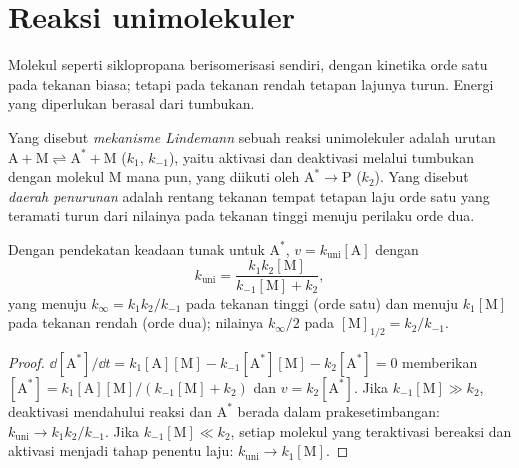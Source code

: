 \section{Reaksi unimolekuler}

Molekul seperti siklopropana berisomerisasi sendiri, dengan kinetika orde
satu pada tekanan biasa; tetapi pada tekanan rendah tetapan lajunya turun.
Energi yang diperlukan berasal dari tumbukan.

\begin{definition}\label{def:b3:complex-kinetics:lindemann}
Yang disebut \emph{mekanisme Lindemann} sebuah
reaksi unimolekuler adalah urutan $\mathrm{A + M \rightleftharpoons A^* + M}$ ($k_1$,
$k_{-1}$), yaitu aktivasi dan deaktivasi melalui tumbukan dengan molekul M
mana pun, yang diikuti oleh $\mathrm{A^* \to P}$ ($k_2$). Yang disebut
\emph{daerah penurunan} adalah rentang tekanan tempat
tetapan laju orde satu yang teramati turun dari nilainya pada tekanan tinggi
menuju perilaku orde dua.
\end{definition}

\begin{theorem}\label{thm:b3:complex-kinetics:lindemann}
Dengan pendekatan keadaan tunak untuk $\mathrm{A^*}$, $v = k_{\mathrm{uni}}[\mathrm A]$ dengan
\[
  k_{\mathrm{uni}} = \frac{k_1k_2[\mathrm M]}{k_{-1}[\mathrm M] + k_2},
\]
yang menuju $k_\infty = k_1k_2/k_{-1}$ pada tekanan tinggi (orde satu) dan menuju
$k_1[\mathrm M]$ pada tekanan rendah (orde dua); nilainya $k_\infty/2$ pada
$[\mathrm M]_{1/2} = k_2/k_{-1}$.
\end{theorem}

\begin{proof}
$\dd[\mathrm{A^*}]/\dd t = k_1[\mathrm A][\mathrm M] - k_{-1}[\mathrm{A^*}][\mathrm M] - k_2[\mathrm{A^*}] = 0$
memberikan $[\mathrm{A^*}] =
k_1[\mathrm A][\mathrm M]/(k_{-1}[\mathrm M] + k_2)$ dan $v = k_2[\mathrm{A^*}]$. Jika
$k_{-1}[\mathrm M] \gg k_2$, deaktivasi mendahului reaksi dan $\mathrm{A^*}$ berada
dalam prakesetimbangan: $k_{\mathrm{uni}} \to k_1k_2/k_{-1}$. Jika $k_{-1}[\mathrm M]
\ll k_2$, setiap molekul yang teraktivasi bereaksi dan aktivasi menjadi tahap
penentu laju: $k_{\mathrm{uni}} \to k_1[\mathrm M]$.
\end{proof}


